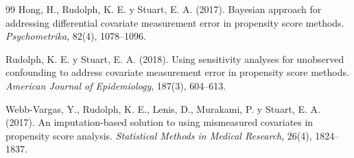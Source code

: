 \begin{thebibliography}{99}
 Hong, H., Rudolph, K. E. y Stuart, E. A. (2017). Bayesian approach for addressing differential covariate measurement error in propensity score methods. \emph{Psychometrika}, 82(4), 1078--1096.

 Rudolph, K. E. y Stuart, E. A. (2018). Using sensitivity analyses for unobserved confounding to address covariate measurement error in propensity score methods. \emph{American Journal of Epidemiology}, 187(3), 604--613.

 Webb-Vargas, Y., Rudolph, K. E., Lenis, D., Murakami, P. y Stuart, E. A. (2017). An imputation-based solution to using mismeasured covariates in propensity score analysis. \emph{Statistical Methods in Medical Research}, 26(4), 1824--1837.

\end{thebibliography}
